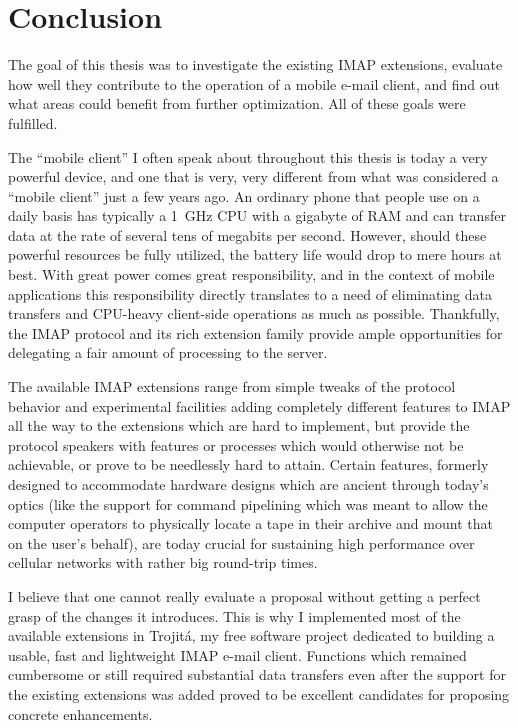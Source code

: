 \documentclass[trojita]{subfiles}
\begin{document}
\chapter{Conclusion}
\label{sec:conclusion}

The goal of this thesis was to investigate the existing IMAP extensions, evaluate how well they contribute to the
operation of a mobile e-mail client, and find out what areas could benefit from further optimization.  All of these
goals were fulfilled.

The ``mobile client'' I often speak about throughout this thesis is today a very powerful device, and one that is very,
very different from what was considered a ``mobile client'' just a few years ago.  An ordinary phone that people use on
a daily basis has typically a 1~GHz CPU with a gigabyte of RAM and can transfer data at the rate of several tens of
megabits per second.  However, should these powerful resources be fully utilized, the battery life would drop to mere
hours at best.  With great power comes great responsibility, and in the context of mobile applications this
responsibility directly translates to a need of eliminating data transfers and CPU-heavy client-side operations as much
as possible.  Thankfully, the IMAP protocol and its rich extension family provide ample opportunities for delegating a
fair amount of processing to the server.

The available IMAP extensions range from simple tweaks of the protocol behavior and experimental facilities adding
completely different features to IMAP all the way to the extensions which are hard to implement, but provide the
protocol speakers with features or processes which would otherwise not be achievable, or prove to be needlessly hard to
attain.  Certain features, formerly designed to accommodate hardware designs which are ancient through today's optics
(like the support for command pipelining which was meant to allow the computer operators to physically locate a tape in
their archive and mount that on the user's behalf), are today crucial for sustaining high performance over cellular
networks with rather big round-trip times.

I believe that one cannot really evaluate a proposal without getting a perfect grasp of the changes it introduces.  This
is why I implemented most of the available extensions in Trojitá, my free software project dedicated to building a
usable, fast and lightweight IMAP e-mail client.  Functions which remained cumbersome or still required substantial data
transfers even after the support for the existing extensions was added proved to be excellent candidates for proposing
concrete enhancements.
\end{document}
